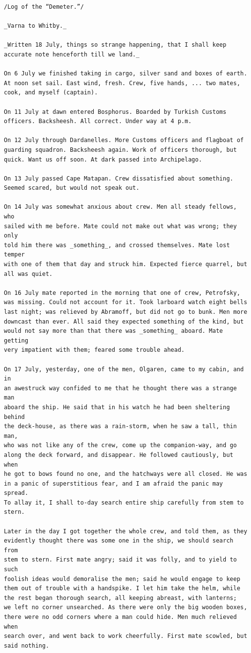 \documentclass{article}
\begin{document}
\begin{verbatim}
/Log of the “Demeter.”/

_Varna to Whitby._

_Written 18 July, things so strange happening, that I shall keep
accurate note henceforth till we land._

On 6 July we finished taking in cargo, silver sand and boxes of earth.
At noon set sail. East wind, fresh. Crew, five hands, ... two mates,
cook, and myself (captain).

On 11 July at dawn entered Bosphorus. Boarded by Turkish Customs
officers. Backsheesh. All correct. Under way at 4 p.m.

On 12 July through Dardanelles. More Customs officers and flagboat of
guarding squadron. Backsheesh again. Work of officers thorough, but
quick. Want us off soon. At dark passed into Archipelago.

On 13 July passed Cape Matapan. Crew dissatisfied about something.
Seemed scared, but would not speak out.

On 14 July was somewhat anxious about crew. Men all steady fellows, who
sailed with me before. Mate could not make out what was wrong; they only
told him there was _something_, and crossed themselves. Mate lost temper
with one of them that day and struck him. Expected fierce quarrel, but
all was quiet.

On 16 July mate reported in the morning that one of crew, Petrofsky,
was missing. Could not account for it. Took larboard watch eight bells
last night; was relieved by Abramoff, but did not go to bunk. Men more
downcast than ever. All said they expected something of the kind, but
would not say more than that there was _something_ aboard. Mate getting
very impatient with them; feared some trouble ahead.

On 17 July, yesterday, one of the men, Olgaren, came to my cabin, and in
an awestruck way confided to me that he thought there was a strange man
aboard the ship. He said that in his watch he had been sheltering behind
the deck-house, as there was a rain-storm, when he saw a tall, thin man,
who was not like any of the crew, come up the companion-way, and go
along the deck forward, and disappear. He followed cautiously, but when
he got to bows found no one, and the hatchways were all closed. He was
in a panic of superstitious fear, and I am afraid the panic may spread.
To allay it, I shall to-day search entire ship carefully from stem to
stern.

Later in the day I got together the whole crew, and told them, as they
evidently thought there was some one in the ship, we should search from
stem to stern. First mate angry; said it was folly, and to yield to such
foolish ideas would demoralise the men; said he would engage to keep
them out of trouble with a handspike. I let him take the helm, while
the rest began thorough search, all keeping abreast, with lanterns;
we left no corner unsearched. As there were only the big wooden boxes,
there were no odd corners where a man could hide. Men much relieved when
search over, and went back to work cheerfully. First mate scowled, but
said nothing.


\end{verbatim}
\end{document}
